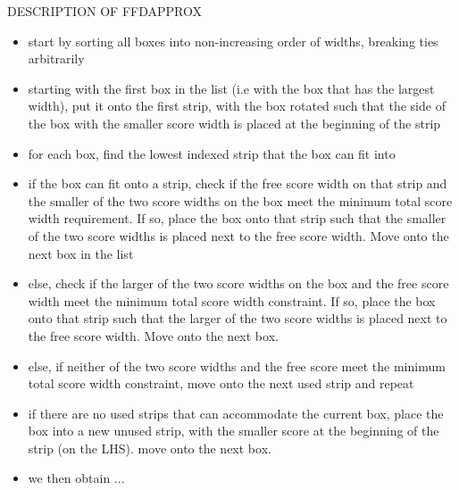 \documentclass[oribibl]{llncs}
\begin{document}
DESCRIPTION OF FFDAPPROX 
\begin{itemize}
	\item start by sorting all boxes into non-increasing order of widths, breaking ties arbitrarily
	\item starting with the first box in the list (i.e with the box that has the largest width), put it onto the first strip, with the box rotated such that the side of the box with the smaller score width is placed at the beginning of the strip
	\item for each box, find the lowest indexed strip that the box can fit into
	\item if the box can fit onto a strip, check if the free score width on that strip and the smaller of the two score widths on the box meet the minimum total score width requirement. If so, place the box onto that strip such that the smaller of the two score widths is placed next to the free score width. Move onto the next box in the list
	\item else, check if the larger of the two score widths on the box and the free score width meet the minimum total score width constraint. If so, place the box onto that strip such that the larger of the two score widths is placed next to the free score width. Move onto the next box.
	\item else, if neither of the two score widths and the free score meet the minimum total score width constraint, move onto the next used strip and repeat
	\item if there are no used strips that can accommodate the current box, place the box into a new unused strip, with the smaller score at the beginning of the strip (on the LHS). move onto the next box.
	\item we then obtain ...
\end{itemize}
\end{document}
